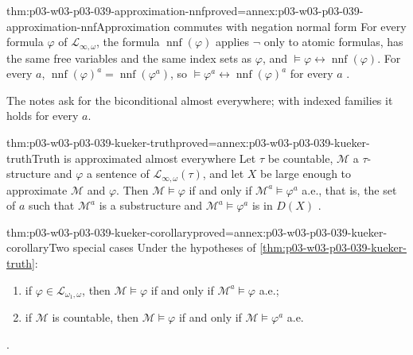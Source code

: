 \begin{hblemma}{thm:p03-w03-p03-039-approximation-nnf}{proved=annex:p03-w03-p03-039-approximation-nnf}{Approximation commutes with negation normal form}
For every formula \(\varphi\) of \(\mathcal L_{\infty,\omega}\), the formula
\(\operatorname{nnf}(\varphi)\) applies \(\neg\) only to atomic formulas, has
the same free variables and the same index sets as \(\varphi\), and
\(\models\varphi\leftrightarrow\operatorname{nnf}(\varphi)\). For every
\(a\), \(\operatorname{nnf}(\varphi)^a=\operatorname{nnf}(\varphi^a)\), so
\(\models\varphi^a\leftrightarrow\operatorname{nnf}(\varphi)^a\) for every
\(a\) \cite[Exs.~1.21 and~2.42, pp.~9 and~24]{Marker2014InfinitaryNotes}.
\end{hblemma}

The notes ask for the biconditional almost everywhere; with indexed
families it holds for every \(a\).

\begin{hbtheorem}{thm:p03-w03-p03-039-kueker-truth}{proved=annex:p03-w03-p03-039-kueker-truth}{Truth is approximated almost everywhere}
Let \(\tau\) be countable, \(\mathcal M\) a \(\tau\)-structure and
\(\varphi\) a sentence of \(\mathcal L_{\infty,\omega}(\tau)\), and let \(X\)
be large enough to approximate \(\mathcal M\) and \(\varphi\). Then
\(\mathcal M\models\varphi\) if and only if
\(\mathcal M^a\models\varphi^a\) a.e., that is, the set of \(a\) such that
\(\mathcal M^a\) is a substructure and \(\mathcal M^a\models\varphi^a\) is in
\(D(X)\) \cite[Thm.~2.43 and Ex.~2.44, pp.~24--25]{Marker2014InfinitaryNotes}.
\end{hbtheorem}

\begin{hbcorollary}{thm:p03-w03-p03-039-kueker-corollary}{proved=annex:p03-w03-p03-039-kueker-corollary}{Two special cases}
Under the hypotheses of \cref{thm:p03-w03-p03-039-kueker-truth}:
\begin{enumerate}
\item if \(\varphi\in\mathcal L_{\omega_1,\omega}\), then
      \(\mathcal M\models\varphi\) if and only if
      \(\mathcal M^a\models\varphi\) a.e.;
\item if \(\mathcal M\) is countable, then \(\mathcal M\models\varphi\) if
      and only if \(\mathcal M\models\varphi^a\) a.e.
\end{enumerate}
\cite[Cor.~2.45, p.~25]{Marker2014InfinitaryNotes}.
\end{hbcorollary}

